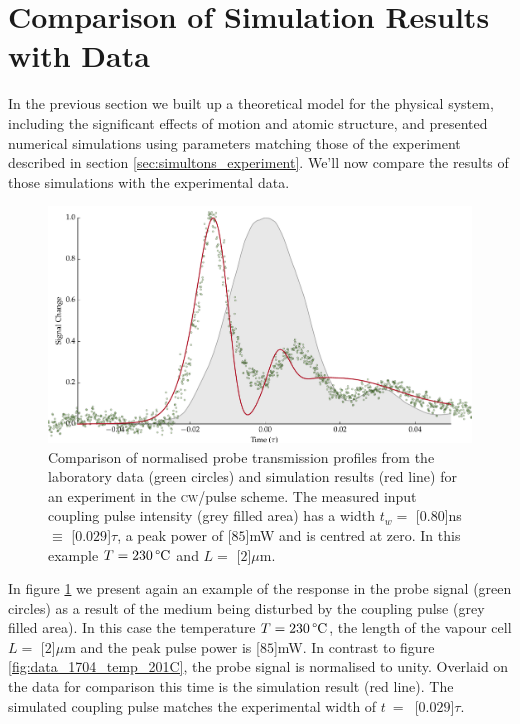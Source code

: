 \section{Comparison of Simulation Results with Data}
  \label{sec:simultons_results}

    In the previous section we built up a theoretical model for the physical
    system, including the significant effects of motion and atomic structure, and
    presented numerical simulations using parameters matching those of the
    experiment described in section \ref{sec:simultons_experiment}. We'll now
    compare the results of those simulations with the experimental data.

    \begin{figure}[h]
      \includegraphics[width=\linewidth]{figs/06_simultons/mb_vee2g_15c_130p_0330t_230C_sb50_120vel010_10_002um_fig1.pdf}
      \caption{
      Comparison of normalised probe transmission profiles from the  laboratory
      data (green circles) and simulation results (red line) for an  experiment
      in the \textsc{cw}/pulse scheme. The measured input coupling  pulse
      intensity (grey filled area) has a width $t_w = $ \unit[$0.80$]{ns}  $
      \equiv $ \unit[$0.029$]{$\tau$}, a peak power of \unit[$85$]{mW}  and is
      centred at zero. In this example $T = \unit[230]{\textrm{\textdegree C}}$
      and $L = $ \unit[$2$]{$\mu$m}.
      }
      \label{fig:sim_data_0703_temp_210C}
    \end{figure}

    In figure \ref{fig:sim_data_0703_temp_210C} we present again an example of
    the response in the probe signal (green circles) as a result of the medium
    being disturbed by the coupling pulse (grey filled area). In this case the
    temperature $T = \unit[230]{\textrm{\textdegree C}}$, the length of the
    vapour cell $L =$ \unit[$2$]{$\mu$m} and the peak pulse power is
    \unit[$85$]{mW}. In contrast to figure \ref{fig:data_1704_temp_201C}, the
    probe signal is normalised to unity. Overlaid on the data for comparison
    this time is the simulation result (red line). The simulated coupling pulse
    matches the experimental width of $t~=$~\unit[$0.029$]{$\tau$}.

